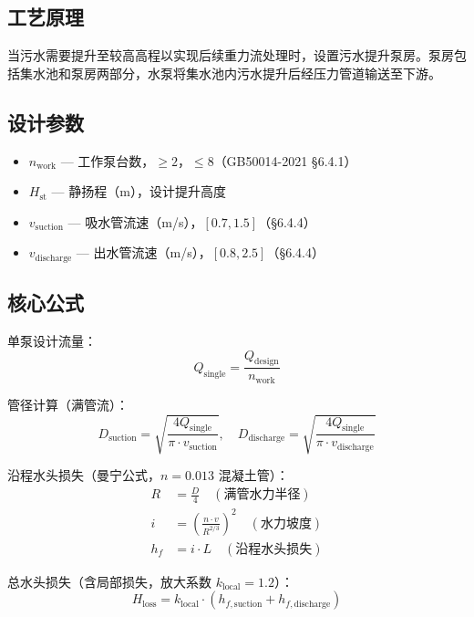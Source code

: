\documentclass[12pt,a4paper]{ctexart}
\begin{document}
\subsection{工艺原理}
当污水需要提升至较高高程以实现后续重力流处理时，设置污水提升泵房。泵房包括集水池和泵房两部分，水泵将集水池内污水提升后经压力管道输送至下游。

\subsection{设计参数}
\begin{itemize}
  \item $n_{\text{work}}$ — 工作泵台数，$\ge 2$，$\le 8$（GB50014-2021 §6.4.1）
  \item $H_{\text{st}}$ — 静扬程（m），设计提升高度
  \item $v_{\text{suction}}$ — 吸水管流速（m/s），$[0.7, 1.5]$（§6.4.4）
  \item $v_{\text{discharge}}$ — 出水管流速（m/s），$[0.8, 2.5]$（§6.4.4）
\end{itemize}

\subsection{核心公式}
单泵设计流量：
\begin{equation}
Q_{\text{single}} = \frac{Q_{\text{design}}}{n_{\text{work}}}
\end{equation}

管径计算（满管流）：
\begin{equation}
D_{\text{suction}} = \sqrt{\frac{4 Q_{\text{single}}}{\pi \cdot v_{\text{suction}}}}, \quad
D_{\text{discharge}} = \sqrt{\frac{4 Q_{\text{single}}}{\pi \cdot v_{\text{discharge}}}}
\end{equation}

沿程水头损失（曼宁公式，$n = 0.013$ 混凝土管）：
\begin{align}
R &= \frac{D}{4} \quad (\text{满管水力半径}) \\
i &= \left(\frac{n \cdot v}{R^{2/3}}\right)^2 \quad (\text{水力坡度}) \\
h_f &= i \cdot L \quad (\text{沿程水头损失})
\end{align}

总水头损失（含局部损失，放大系数 $k_{\text{local}} = 1.2$）：
\begin{equation}
H_{\text{loss}} = k_{\text{local}} \cdot (h_{f,\text{suction}} + h_{f,\text{discharge}})
\end{equation}
\end{document}
